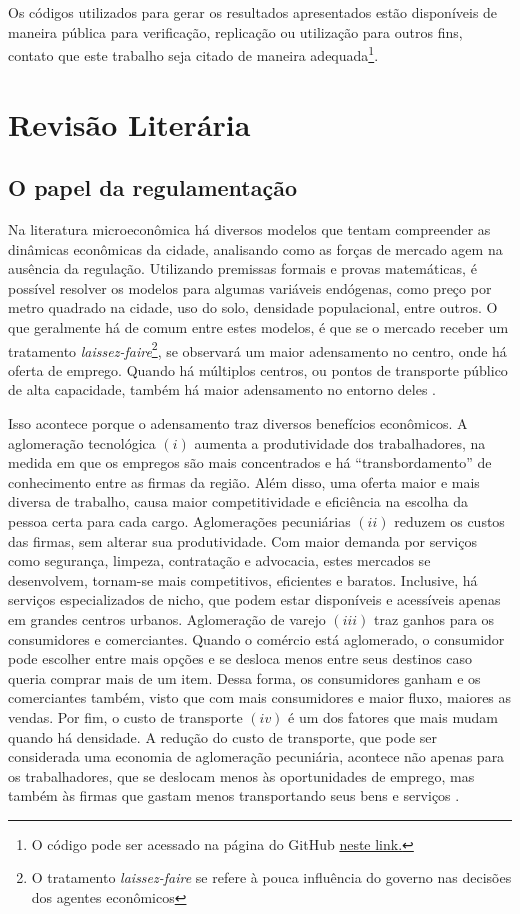 Os códigos utilizados para gerar os resultados apresentados estão disponíveis de maneira pública para verificação, replicação ou utilização para outros fins, contato que este trabalho seja citado de maneira adequada\footnote{O código pode ser acessado na página do GitHub \href{https://github.com/gustavo-tm}{neste link.}}.


\chapter{Revisão Literária}
\label{chp:revisao}

\section{O papel da regulamentação}

Na literatura microeconômica há diversos modelos que tentam compreender as dinâmicas econômicas da cidade, analisando como as forças de mercado agem na ausência da regulação. Utilizando premissas formais e provas matemáticas, é possível resolver os modelos para algumas variáveis endógenas, como preço por metro quadrado na cidade, uso do solo, densidade populacional, entre outros. O que geralmente há de comum entre estes modelos, é que se o mercado receber um tratamento \textit{laissez-faire}\footnote{O tratamento \textit{laissez-faire} se refere à pouca influência do governo nas decisões dos agentes econômicos}, se observará um maior adensamento no centro, onde há oferta de emprego. Quando há múltiplos centros, ou pontos de transporte público de alta capacidade, também há maior adensamento no entorno deles \cite{papageorgiou2012essay, fujita1989urban}.


Isso acontece porque o adensamento traz diversos benefícios econômicos. A aglomeração tecnológica $(i)$ aumenta a produtividade dos trabalhadores, na medida em que os empregos são mais concentrados e há ``transbordamento'' de conhecimento entre as firmas da região. Além disso, uma oferta maior e mais diversa de trabalho, causa maior competitividade e eficiência na escolha da pessoa certa para cada cargo. Aglomerações pecuniárias $(ii)$ reduzem os custos das firmas, sem alterar sua produtividade. Com maior demanda por serviços como segurança, limpeza, contratação e advocacia, estes mercados se desenvolvem, tornam-se mais competitivos, eficientes e baratos. Inclusive, há serviços especializados de nicho, que podem estar disponíveis e acessíveis apenas em grandes centros urbanos. Aglomeração de varejo $(iii)$ traz ganhos para os consumidores e comerciantes. Quando o comércio está aglomerado, o consumidor pode escolher entre mais opções e se desloca menos entre seus destinos caso queria comprar mais de um item. Dessa forma, os consumidores ganham e os comerciantes também, visto que com mais consumidores e maior fluxo, maiores as vendas. Por fim, o custo de transporte $(iv)$ é um dos fatores que mais mudam quando há densidade. A redução do custo de transporte, que pode ser considerada uma economia de aglomeração pecuniária, acontece não apenas para os trabalhadores, que se deslocam menos às oportunidades de emprego, mas também às firmas que gastam menos transportando seus bens e serviços \cite{brueckner2011lectures}.

